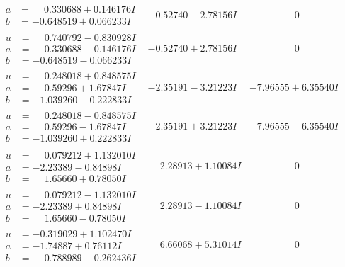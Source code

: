 \documentclass[1p]{elsarticle_modified}
\theoremstyle{definition}
\begin{document}
$$\begin{array}{c|c|c}
\begin{aligned}
a &= \phantom{-}0.330688 + 0.146176 I \\
b &= -0.648519 + 0.066233 I\end{aligned}
 & -0.52740 - 2.78156 I & \phantom{-0.000000 } 0 \\ \hline\begin{aligned}
u &= \phantom{-}0.740792 - 0.830928 I \\
a &= \phantom{-}0.330688 - 0.146176 I \\
b &= -0.648519 - 0.066233 I\end{aligned}
 & -0.52740 + 2.78156 I & \phantom{-0.000000 } 0 \\ \hline\begin{aligned}
u &= \phantom{-}0.248018 + 0.848575 I \\
a &= \phantom{-}0.59296 + 1.67847 I \\
b &= -1.039260 - 0.222833 I\end{aligned}
 & -2.35191 - 3.21223 I & -7.96555 + 6.35540 I \\ \hline\begin{aligned}
u &= \phantom{-}0.248018 - 0.848575 I \\
a &= \phantom{-}0.59296 - 1.67847 I \\
b &= -1.039260 + 0.222833 I\end{aligned}
 & -2.35191 + 3.21223 I & -7.96555 - 6.35540 I \\ \hline\begin{aligned}
u &= \phantom{-}0.079212 + 1.132010 I \\
a &= -2.23389 - 0.84898 I \\
b &= \phantom{-}1.65660 + 0.78050 I\end{aligned}
 & \phantom{-}2.28913 + 1.10084 I & \phantom{-0.000000 } 0 \\ \hline\begin{aligned}
u &= \phantom{-}0.079212 - 1.132010 I \\
a &= -2.23389 + 0.84898 I \\
b &= \phantom{-}1.65660 - 0.78050 I\end{aligned}
 & \phantom{-}2.28913 - 1.10084 I & \phantom{-0.000000 } 0 \\ \hline\begin{aligned}
u &= -0.319029 + 1.102470 I \\
a &= -1.74887 + 0.76112 I \\
b &= \phantom{-}0.788989 - 0.262436 I\end{aligned}
 & \phantom{-}6.66068 + 5.31014 I & \phantom{-0.000000 } 0 \\ \hline\begin{aligned}

\end{aligned}
\end{array}$$
\end{document}
